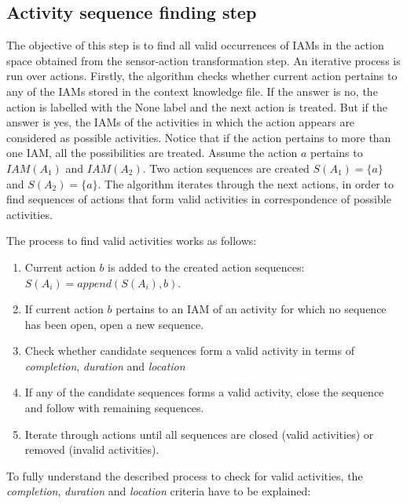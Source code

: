 \subsection{Activity sequence finding step}
\label{subsec:clustering:sa3:find}

The objective of this step is to find all valid occurrences of IAMs in the action space obtained from the sensor-action transformation step. An iterative process is run over actions. Firstly, the algorithm checks whether current action pertains to any of the IAMs stored in the context knowledge file. If the answer is no, the action is labelled with the None label and the next action is treated. But if the answer is yes, the IAMs of the activities in which the action appears are considered as possible activities. Notice that if the action pertains to more than one IAM, all the possibilities are treated. Assume the action $a$ pertains to $IAM(A_1)$ and $IAM(A_2)$. Two action sequences are created $S(A_1) = \{a\}$ and $S(A_2) = \{a\}$. The algorithm iterates through the next actions, in order to find sequences of actions that form valid activities in correspondence of possible activities.

The process to find valid activities works as follows:

\begin{enumerate}
 \item Current action $b$ is added to the created action sequences: $S(A_i) = append(S(A_i), b)$.
 \item If current action $b$ pertains to an IAM of an activity for which no sequence has been open, open a new sequence.
 \item Check whether candidate sequences form a valid activity in terms of \textit{completion}, \textit{duration} and \textit{location}
 \item If any of the candidate sequences forms a valid activity, close the sequence and follow with remaining sequences.
 \item Iterate through actions until all sequences are closed (valid activities) or removed (invalid activities).
\end{enumerate}

To fully understand the described process to check for valid activities, the \textit{completion}, \textit{duration} and \textit{location} criteria have to be explained:

